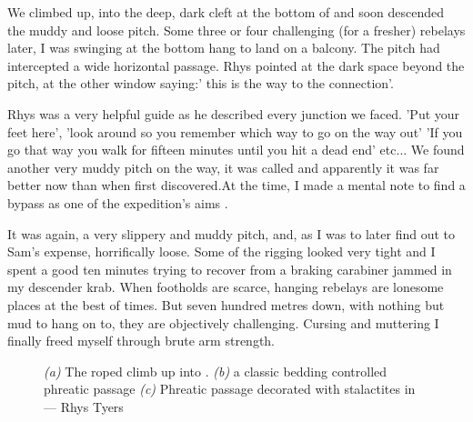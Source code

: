 We climbed up, into the deep, dark cleft at the bottom of  and soon descended the muddy and loose  pitch. Some three or four challenging (for a fresher) rebelays later, I was swinging at the bottom hang to land on a balcony. The pitch had intercepted a wide horizontal passage. Rhys pointed at the dark space beyond the pitch, at the other window saying:' this is the way to the connection'. 

Rhys was a very helpful guide as he described every junction we faced. 'Put your feet here', 'look around so you remember which way to go on the way out' 'If you go that way you walk for fifteen minutes until you hit a dead end' etc... We found another very muddy pitch on the way,  it was called and apparently it was far better now than when first discovered.At the time, I made a mental note to find a bypass as one of the expedition's aims . 

It was again, a very slippery and muddy pitch, and, as I was to later find out to Sam's expense, horrifically loose. Some of the rigging looked very tight and I spent a good ten minutes trying to recover from a braking carabiner jammed in my descender krab. When footholds are scarce, hanging rebelays are lonesome places at the best of times. But seven hundred metres down, with nothing but mud to hang on to, they are objectively challenging. Cursing and muttering I finally freed myself through brute arm strength.

\begin{figure}[t!]
\checkoddpage \ifoddpage \forcerectofloat \else \forceversofloat \fi
\centering
    \begin{subfigure}[t]{0.393\textwidth}
        \centering
        \caption{} \label{HelmsDeep}
    \end{subfigure}
        \hfill
\begin{subfigure}[t]{0.59\textwidth}
\centering
{}
 \caption{}\label{water chamber below helm's deep}
\end{subfigure}
    \vspace{0cm}
    \begin{subfigure}[t]{\textwidth}
    \centering
        \caption{} \label{Atlantis}
    \end{subfigure}
    \caption{
    \emph{(a)} The roped climb up into \protect{}.  
     \emph{(b)} \protect{} a classic bedding controlled phreatic passage
     \emph{(c)} Phreatic passage decorated with stalactites in \protect{} --- Rhys Tyers }
\end{figure}

